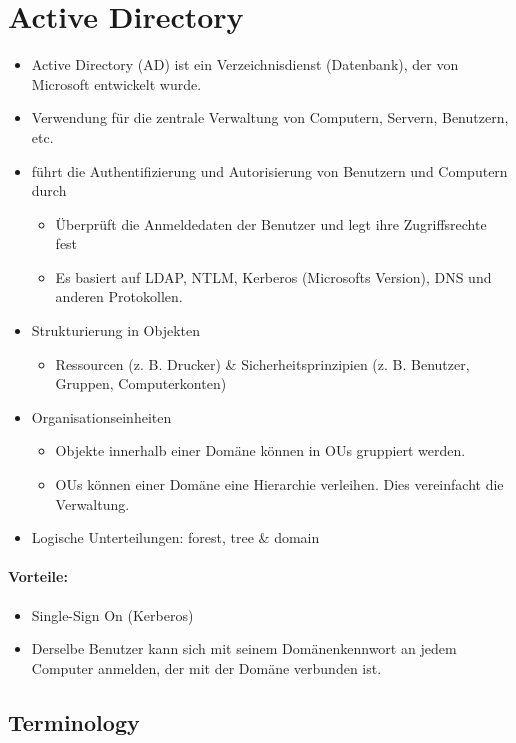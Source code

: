 \section{Active Directory}
\begin{itemize}
  \item Active Directory (AD) ist ein Verzeichnisdienst (Datenbank), der von Microsoft entwickelt wurde.
  \item Verwendung für die zentrale Verwaltung von Computern, Servern, Benutzern, etc.
  \item führt die Authentifizierung und Autorisierung von Benutzern und Computern durch
  \begin{itemize}
    \item Überprüft die Anmeldedaten der Benutzer und legt ihre Zugriffsrechte fest
    \item Es basiert auf LDAP, NTLM, Kerberos (Microsofts Version), DNS und anderen Protokollen.
  \end{itemize}
  \item Strukturierung in Objekten
  \begin{itemize}
    \item Ressourcen (z. B. Drucker) \& Sicherheitsprinzipien (z. B. Benutzer, Gruppen, Computerkonten)
  \end{itemize}
  \item Organisationseinheiten
  \begin{itemize}
    \item Objekte innerhalb einer Domäne können in OUs gruppiert werden.
    \item OUs können einer Domäne eine Hierarchie verleihen. Dies vereinfacht die Verwaltung.
  \end{itemize}
  \item Logische Unterteilungen: forest, tree \& domain
\end{itemize}

\paragraph{Vorteile:}
\begin{itemize}
  \item Single-Sign On (Kerberos)
  \item Derselbe Benutzer kann sich mit seinem Domänenkennwort an jedem Computer anmelden, der mit der Domäne verbunden ist.
\end{itemize}

\subsection{Terminology}
